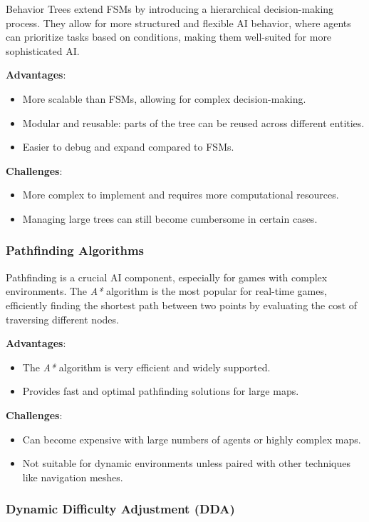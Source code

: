 Behavior Trees extend FSMs by introducing a hierarchical decision-making process. They allow for more structured and flexible AI behavior, where agents can prioritize tasks based on conditions, making them well-suited for more sophisticated AI.

\textbf{Advantages}:
\begin{itemize}
    \item More scalable than FSMs, allowing for complex decision-making.
    \item Modular and reusable: parts of the tree can be reused across different entities.
    \item Easier to debug and expand compared to FSMs.
\end{itemize}

\textbf{Challenges}:
\begin{itemize}
    \item More complex to implement and requires more computational resources.
    \item Managing large trees can still become cumbersome in certain cases.
\end{itemize}

\subsubsection{Pathfinding Algorithms}

Pathfinding is a crucial AI component, especially for games with complex environments. The \textit{A*} algorithm is the most popular for real-time games, efficiently finding the shortest path between two points by evaluating the cost of traversing different nodes.

\textbf{Advantages}:
\begin{itemize}
    \item The \textit{A*} algorithm is very efficient and widely supported.
    \item Provides fast and optimal pathfinding solutions for large maps.
\end{itemize}

\textbf{Challenges}:
\begin{itemize}
    \item Can become expensive with large numbers of agents or highly complex maps.
    \item Not suitable for dynamic environments unless paired with other techniques like navigation meshes.
\end{itemize}

\subsubsection{Dynamic Difficulty Adjustment (DDA)}

